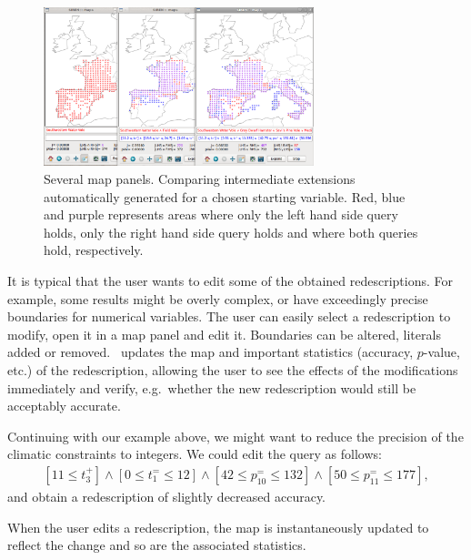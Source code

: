 \begin{figure}
  \centering
\includegraphics[width=0.7\textwidth]{screenshots/comparison}
  \caption{Several map panels. Comparing intermediate extensions automatically generated for a chosen starting variable. Red, blue and purple represents areas where only the left hand side query holds, only the right hand side query holds and where both queries hold, respectively.}
  \label{fig:comparison}
\end{figure}


 It is typical that the user wants to
edit some of the obtained redescriptions. For example, some results
might be overly complex, or have exceedingly precise boundaries for
numerical variables. The user can easily select a redescription to
modify, open it in a map panel and edit it. Boundaries can be altered,
literals added or removed. \Siren\ updates the map and important
statistics (accuracy, $p$-value, etc.) of the redescription, allowing
the user to see the effects of the modifications immediately and
verify, e.g.\ whether the new redescription would still be acceptably
accurate.

Continuing with our example above, we might want to reduce the
precision of the climatic constraints to integers. We could edit the
query as follows:
\begin{equation*}
\begin{array}{l}
[11 \leq t_{3}^{+}] \land  [0 \leq t_{1}^{=} \leq 12]%
\land  [42 \leq p_{10}^{=} \leq 132] \land [50 \leq p_{11}^{=} \leq 177],
\end{array}
\end{equation*}
and obtain a redescription of slightly decreased accuracy. %

When the user edits a redescription, the map is instantaneously updated to reflect the change and so are the associated statistics.

